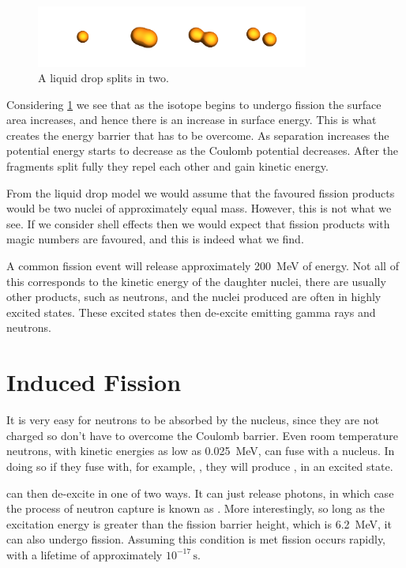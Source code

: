 \documentclass[fleqn]{NotesClass}
\begin{document}
    \begin{figure}
        \includegraphics[width=0.8\textwidth]{images/fission-liquid-drop-split.pdf}
        \caption{A liquid drop splits in two.}
        \label{fig:liquid drop split fission}
    \end{figure}
    
    Considering \cref{fig:liquid drop split fission} we see that as the isotope begins to undergo fission the surface area increases, and hence there is an increase in surface energy.
    This is what creates the energy barrier that has to be overcome.
    As separation increases the potential energy starts to decrease as the Coulomb potential decreases.
    After the fragments split fully they repel each other and gain kinetic energy.
    
    From the liquid drop model we would assume that the favoured fission products would be two nuclei of approximately equal mass.
    However, this is not what we see.
    If we consider shell effects then we would expect that fission products with magic numbers are favoured, and this is indeed what we find.
    
    A common fission event will release approximately \qty{200}{\MeV} of energy.
    Not all of this corresponds to the kinetic energy of the daughter nuclei, there are usually other products, such as neutrons, and the nuclei produced are often in highly excited states.
    These excited states then de-excite emitting gamma rays and neutrons.
    
    \section{Induced Fission}
    It is very easy for neutrons to be absorbed by the nucleus, since they are not charged so don't have to overcome the Coulomb barrier.
    Even room temperature neutrons, with kinetic energies as low as \qty{0.025}{\MeV}, can fuse with a nucleus.
    In doing so if they fuse with, for example, , they will produce , in an excited state.
    
     can then de-excite in one of two ways.
    It can just release photons, in which case the process of neutron capture is known as .
    More interestingly, so long as the excitation energy is greater than the fission barrier height, which is \qty{6.2}{\MeV}, it can also undergo fission.
    Assuming this condition is met fission occurs rapidly, with a lifetime of approximately \(10^{-17}\,\unit{\second}\).
    
\end{document}
